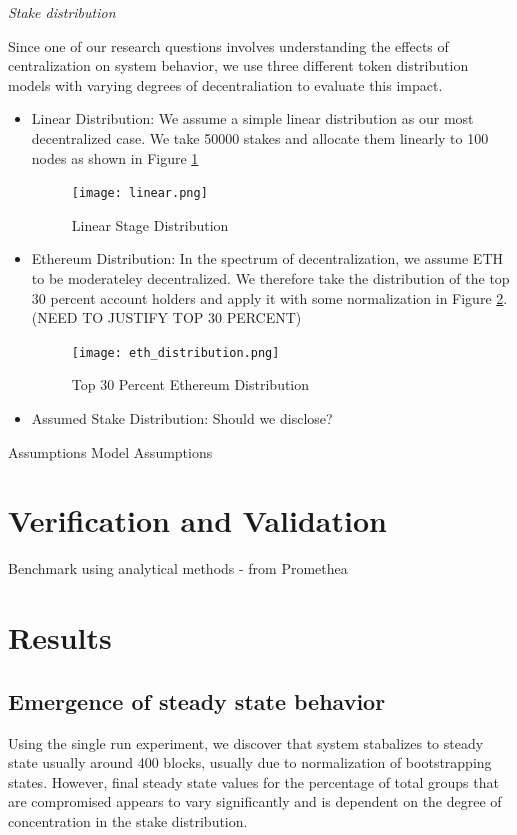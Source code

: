 \documentclass[conference]{IEEEtran}
\begin{document}
\textit{Stake distribution} 

Since one of our research questions involves understanding the effects of centralization
on system behavior, we use three different token distribution models with 
varying degrees of decentraliation to evaluate this impact. 

\begin{itemize}
\item Linear Distribution: We assume a simple linear distribution as our most 
decentralized case. We take 50000 stakes and allocate them linearly to 100 nodes
as shown in Figure \ref{fig:linear_distribution}

\begin{figure}
    \texttt{[image: linear.png]}
    \caption{Linear Stage Distribution}
    \label{fig:linear_distribution}
\end{figure}

\item Ethereum Distribution: In the spectrum of decentralization, we assume 
ETH to be moderateley decentralized. We therefore take the distribution of the 
top 30 percent account holders and apply it with some normalization in Figure \ref{fig:eth_distribution}.
(NEED TO JUSTIFY TOP 30 PERCENT)

\begin{figure}
    \texttt{[image: eth\_distribution.png]}
    \caption{Top 30 Percent Ethereum Distribution}
    \label{fig:eth_distribution}
\end{figure}

\item Assumed Stake Distribution: Should we disclose?
\end{itemize}


Assumptions
Model Assumptions
    
\section{Verification and Validation}
Benchmark using analytical methods - from Promethea

\section{Results}
\subsection{Emergence of steady state behavior}
Using the single run experiment, we discover that system stabalizes to steady state
usually around 400 blocks, usually due to normalization of bootstrapping states. 
However, final steady state values for the percentage of total groups that are compromised
appears to vary significantly and is dependent on the degree of concentration in the 
stake distribution. 
\end{document}
